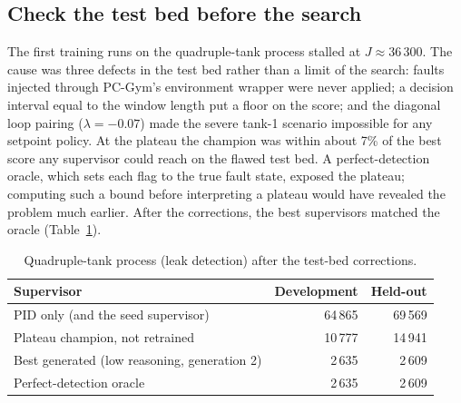 \subsection{Check the test bed before the search}
\label{sec:tank-testbed-check}
The first training runs on the quadruple-tank process stalled at
$J \approx 36\,300$. The cause was three defects in the test bed rather than
a limit of the search: faults injected through PC-Gym's environment wrapper
were never applied; a decision interval equal to the window length put a
floor on the score; and the diagonal loop pairing ($\lambda = -0.07$) made the
severe tank-1 scenario impossible for any setpoint policy. At the plateau the
champion was within about 7\% of the best score any supervisor could reach on
the flawed test bed. A perfect-detection oracle, which sets each flag to the
true fault state, exposed the plateau; computing such a bound before
interpreting a plateau would have revealed the problem much earlier. After
the corrections, the best supervisors matched the oracle
(Table~\ref{tab:four}).

\begin{table}[tb]
  \centering
  \caption{Quadruple-tank process (leak detection) after the test-bed
    corrections.}
  \label{tab:four}
  \begin{tabular}{@{}lrr@{}}
    \toprule
    Supervisor & Development & Held-out \\
    \midrule
    PID only (and the seed supervisor)          & 64\,865 & 69\,569 \\
    Plateau champion, not retrained             & 10\,777 & 14\,941 \\
    Best generated (low reasoning, generation 2) &  2\,635 &  2\,609 \\
    Perfect-detection oracle                    &  2\,635 &  2\,609 \\
    \bottomrule
  \end{tabular}
\end{table}

